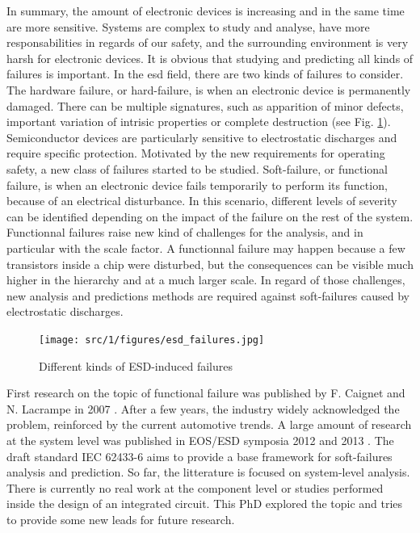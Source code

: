 In summary, the amount of electronic devices is increasing and in the same time are more sensitive.
Systems are complex to study and analyse, have more responsabilities in regards of our safety, and the surrounding environment is very harsh for electronic devices.
It is obvious that studying and predicting all kinds of failures is important.
In the \gls{esd} field, there are two kinds of failures to consider.
The hardware failure, or hard-failure, is when an electronic device is permanently damaged.
There can be multiple signatures, such as apparition of minor defects, important variation of intrisic properties or complete destruction (see Fig. \ref{fig:esd-failures}).
Semiconductor devices are particularly sensitive to electrostatic discharges \cite{impactESDsemiconductors} and require specific protection.
Motivated by the new requirements for operating safety, a new class of failures started to be studied.
Soft-failure, or functional failure, is when an electronic device fails temporarily to perform its function, because of an electrical disturbance.
In this scenario, different levels of severity can be identified depending on the impact of the failure on the rest of the system.
Functionnal failures raise new kind of challenges for the analysis, and in particular with the scale factor.
A functionnal failure may happen because a few transistors inside a chip were disturbed, but the consequences can be visible much higher in the hierarchy and at a much larger scale.
In regard of those challenges, new analysis and predictions methods are required against soft-failures caused by electrostatic discharges.

\begin{figure}[!h]
  \centering
  \texttt{[image: src/1/figures/esd\_failures.jpg]}
  \caption{Different kinds of ESD-induced failures}
  \label{fig:esd-failures}
\end{figure}

First research on the topic of functional failure was published by F. Caignet and N. Lacrampe in 2007 \cite{}.
After a few years, the industry widely acknowledged the problem, reinforced by the current automotive trends.
A large amount of research at the system level was published in EOS/ESD symposia 2012 \cite{} and 2013 \cite{}.
The draft standard IEC 62433-6 aims to provide a base framework for soft-failures analysis and prediction.
So far, the litterature is focused on system-level analysis.
There is currently no real work at the component level or studies performed inside the design of an integrated circuit.
This PhD explored the topic and tries to provide some new leads for future research.

